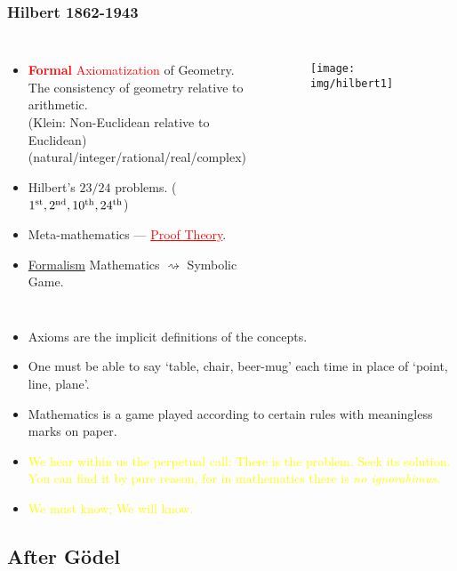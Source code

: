 \documentclass[UTF8,aspectratio=43,11pt,colorlinks,compress,openany]{beamer}%
\begin{document}
\begin{frame}\frametitle{Hilbert 1862-1943}
	\begin{columns}[onlytextwidth]
	\begin{itemize}
		\item \textcolor{red}{\textbf{Formal} Axiomatization} of Geometry.\\
		The consistency of geometry relative to arithmetic.\\
		(Klein: Non-Euclidean relative to Euclidean)\\
		(natural/integer/rational/real/complex)
		\item Hilbert's $23/24$ problems. ($1\textsuperscript{st}, 2\textsuperscript{nd}, 10\textsuperscript{th}, 24\textsuperscript{th}$)
		\item Meta-mathematics --- \textcolor{red}{\underline{Proof Theory}}.
		\item \colorbox{green!30}{\underline{Formalism}} Mathematics $\rightsquigarrow$ Symbolic Game.
	\end{itemize}
			\begin{figure}
				\texttt{[image: img/hilbert1]}
			\end{figure}
	\end{columns}
		\begin{block}{}
			\begin{itemize}\small
			\item Axioms are the implicit definitions of the concepts.
			\item One must be able to say `table, chair, beer-mug' each time in place of `point, line, plane'.
			\item Mathematics is a game played according to certain rules with meaningless marks on paper.
			\item \textcolor{yellow}{We hear within us the perpetual call: There is the problem. Seek its solution. You can find it by pure reason, for in mathematics there is \emph{no ignorabimus}.}
			\item \textcolor{yellow}{We must know; We will know.}
			\end{itemize}
		\end{block}
\end{frame}

\subsection{After G\"odel}
\end{document}
